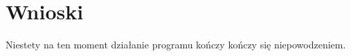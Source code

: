 	\newpage
\section{Wnioski}	%

Niestety na ten moment działanie programu kończy kończy się niepowodzeniem.
